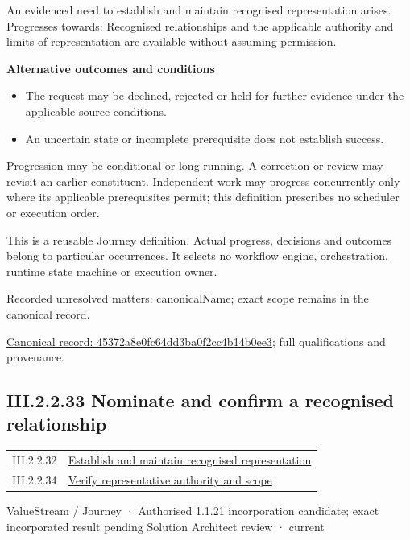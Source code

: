 An evidenced need to establish and maintain recognised representation arises. Progresses towards: Recognised relationships and the applicable authority and limits of representation are available without assuming permission.



\par\medskip\textbf{Alternative outcomes and conditions}\par


\begin{itemize}


\item The request may be declined, rejected or held for further evidence under the applicable source conditions.

\item An uncertain state or incomplete prerequisite does not establish success.

\end{itemize}


Progression may be conditional or long-running. A correction or review may revisit an earlier constituent. Independent work may progress concurrently only where its applicable prerequisites permit; this definition prescribes no scheduler or execution order.



This is a reusable Journey definition. Actual progress, decisions and outcomes belong to particular occurrences. It selects no workflow engine, orchestration, runtime state machine or execution owner.


{\small Recorded unresolved matters: canonicalName; exact scope remains in the canonical record.}\par
{\footnotesize \href{../../../../../../../continuum/strategy/value-stream/45372a8e0fc64dd3ba0f2cc4b14b0ee3.md}{Canonical record: 45372a8e0fc64dd3ba0f2cc4b14b0ee3}; full qualifications and provenance.}\par
\subsection*{III.2.2.33 Nominate and confirm a recognised relationship}
\label{navigation:III.2.2.33}

\begin{longtable}{p{.22\linewidth}p{.73\linewidth}}
III.2.2.32 & \hyperref[element:45372a8e0fc64dd3ba0f2cc4b14b0ee3]{Establish and maintain recognised representation} \\
III.2.2.34 & \hyperref[element:ee60990709724506905c5dbe8e21261a]{Verify representative authority and scope} \\
\end{longtable}
\label{element:d481668c85ab429981ce97bba2fd6e9a}
{\small ValueStream / Journey · Authorised 1.1.21 incorporation candidate; exact incorporated result pending Solution Architect review · current}\par

